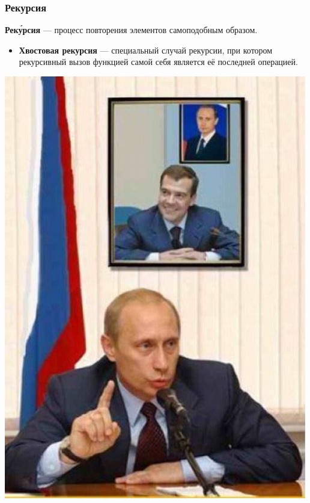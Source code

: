 \documentclass[16pt,pdf,unicode]{beamer}
\begin{document}
\begin{frame}
\frametitle{Рекурсия}
\begin{minipage}{0.5\linewidth}
  
  {\bf Реку́рсия} — процесс повторения элементов самоподобным образом.
  \begin{itemize}
  \item {\bf Хвостовая рекурсия} — специальный случай рекурсии, при котором рекурсивный вызов функцией самой себя является её последней операцией.
    
  \end{itemize}
\end{minipage}
\hspace{0.05\linewidth}
\begin{minipage}{0.38\linewidth}
          \includegraphics[scale=0.3]{recursion.jpg}
\end{minipage}
\end{frame}
\end{document}
